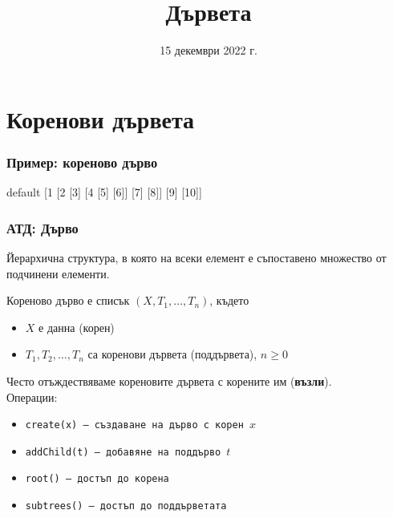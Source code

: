 \documentclass[alsotrans]{beamerswitch}
\title{Дървета}
\date{15 декември 2022 г.}
\newcommand{\sampletree}{%
  \begin{forest} default
    [1 [2 [3] [4 [5] [6]] [7] [8]] [9] [10]]
  \end{forest}%
}
\begin{document}
\begin{frame}
  \titlepage
\end{frame}

\section{Коренови дървета}

\begin{frame}
  \frametitle{Пример: кореново дърво}
  \begin{center}
    \sampletree
  \end{center}
\end{frame}

\begin{frame}
  \frametitle{АТД: Дърво}
  Йерархична структура, в която на всеки елемент е съпоставено множество от подчинени елементи.
  \begin{definition}
    Кореново дърво е списък $(X, T_1, \ldots, T_n)$, където
    \begin{itemize}
    \item $X$ е данна (корен)
    \item $T_1, T_2, \ldots, T_n$ са коренови дървета (поддървета)\pause, \alert{$n\geq 0$}
    \end{itemize}
  \end{definition}
  \pause
  Често отъждествяваме кореновите дървета с корените им (\textbf{възли}).\\
  \pause
  Операции:
  \begin{itemize}
  \item \tt{create(x)} --- създаване на дърво с корен $x$
  \item \tt{addChild(t)} --- добавяне на поддърво $t$
  \item \tt{root()} --- достъп до корена
  \item \tt{subtrees()} --- достъп до поддърветата
  \end{itemize}
\end{frame}
\end{document}
